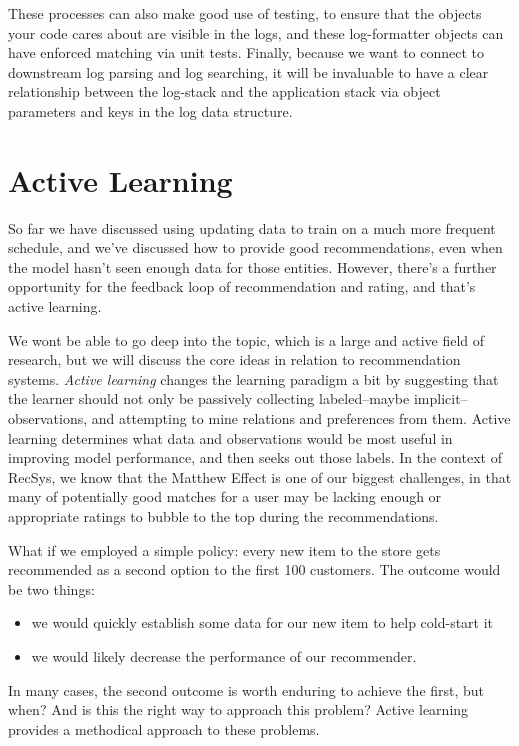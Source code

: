 These processes can also make good use of testing, to ensure that the objects your code cares about are visible in the logs, and these log-formatter objects can have enforced matching via unit tests. Finally, because we want to connect to downstream log parsing and log searching, it will be invaluable to have a clear relationship between the log-stack and the application stack via object parameters and keys in the log data structure.

\section{Active Learning}

So far we have discussed using updating data to train on a much more frequent schedule, and we've discussed how to provide good recommendations, even when the model hasn't seen enough data for those entities. However, there's a further opportunity for the feedback loop of recommendation and rating, and that's active learning.

We wont be able to go deep into the topic, which is a large and active field of research, but we will discuss the core ideas in relation to recommendation systems. \emph{Active learning} changes the learning paradigm a bit by suggesting that the learner should not only be passively collecting labeled–maybe implicit–observations, and attempting to mine relations and preferences from them. Active learning determines what data and observations would be most useful in improving model performance, and then seeks out those labels. In the context of RecSys, we know that the Matthew Effect is one of our biggest challenges, in that many of potentially good matches for a user may be lacking enough or appropriate ratings to bubble to the top during the recommendations. 

What if we employed a simple policy: every new item to the store gets recommended as a second option to the first 100 customers. The outcome would be two things:

\begin{itemize}
\item we would quickly establish some data for our new item to help cold-start it
\item we would likely decrease the performance of our recommender.
\end{itemize}

In many cases, the second outcome is worth enduring to achieve the first, but when? And is this the right way to approach this problem? Active learning provides a methodical approach to these problems.

